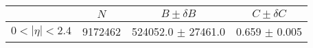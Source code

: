 \begin{tabular}{lccc}
\hline
    &   $N$   & $B \pm \delta B$  &  $C \pm \delta C$ \\
\hline
$0 < |\eta| <2.4$              & 9172462    & 524052.0   $\pm$ 27461.0 & 0.659      $\pm$ 0.005 \\
\hline
\end{tabular}
